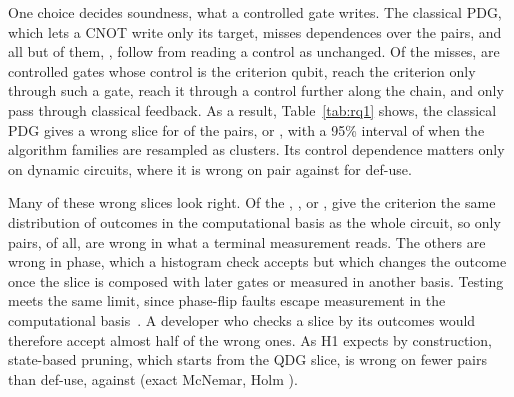 One choice decides soundness, what a controlled gate writes. The classical PDG, which lets a CNOT write only its
target, misses \numCpdgMissTotal{} dependences over the \numNPairs{} pairs, and all but \numCpdgMissFeedback{} of
them, \numCpdgMissControlPct{}, follow from reading a control as unchanged. Of the misses, \numCpdgMissSameWire{} are
controlled gates whose control is the criterion qubit, \numCpdgMissKickback{} reach the criterion only through such
a gate, \numCpdgMissWritten{} reach it through a control further along the chain, and only \numCpdgMissFeedback{}
pass through classical feedback. As a result, Table~\ref{tab:rq1} shows, the classical PDG gives a wrong slice for
\numCpdgUnsound{} of the pairs, or \numCpdgUnsoundPct{}, with a 95\% interval of \numCcCpdgUnsound{} when the
\numCcFamilies{} algorithm families are resampled as clusters. Its control dependence matters only on dynamic
circuits, where it is wrong on \numCpdgDynamicUnsound{} pair against \numDuDynamicUnsound{} for def-use.

Many of these wrong slices look right. Of the \numCpdgUnsound{}, \numFdCpdgZMatch{}, or \numFdCpdgZMatchPct{}, give
the criterion the same distribution of outcomes in the computational basis as the whole circuit, so only
\numFdCpdgObservable{} pairs, \numFdCpdgObservablePct{} of all, are wrong in what a terminal measurement reads. The
others are wrong in phase, which a histogram check accepts but which changes the outcome once the slice is composed
with later gates or measured in another basis. Testing meets the same limit, since phase-flip faults escape
measurement in the computational basis~\cite{oldfield2024faster}. A developer who checks a slice by its outcomes
would therefore accept almost half of the wrong ones. As H1 expects by construction, state-based pruning, which
starts from the QDG slice, is wrong on fewer pairs than def-use, \numRqOneQUnsound{} against \numRqOneDuUnsound{}
(exact McNemar, Holm \numHOnePHolm{}).

